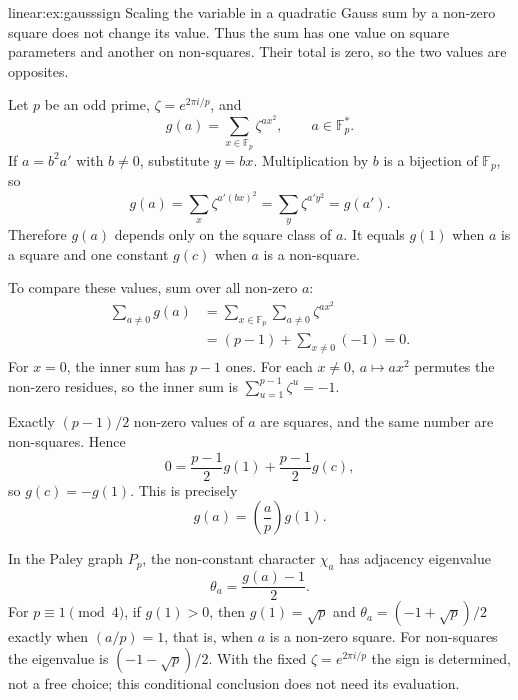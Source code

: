 \begin{solution}{linear:ex:gausssign}
\idea Scaling the variable in a quadratic Gauss sum by a non-zero square does not change its value. Thus the sum has one value on square parameters and another on non-squares. Their total is zero, so the two values are opposites.

\writeup Let $p$ be an odd prime, $\zeta=e^{2\pi i/p}$, and
\[
g(a)=\sum_{x\in\mathbb F_p}\zeta^{a x^2},
\qquad a\in\mathbb F_p^*.
\]
If $a=b^2a'$ with $b\ne0$, substitute $y=bx$. Multiplication by $b$ is a bijection of $\mathbb F_p$, so
\[
g(a)=\sum_x\zeta^{a'(bx)^2}=\sum_y\zeta^{a'y^2}=g(a').
\]
Therefore $g(a)$ depends only on the square class of $a$. It equals $g(1)$ when $a$ is a square and one constant $g(c)$ when $a$ is a non-square.

To compare these values, sum over all non-zero $a$:
\[
\begin{aligned}
\sum_{a\ne0}g(a)
&=\sum_{x\in\mathbb F_p}\sum_{a\ne0}\zeta^{ax^2}\\
&=(p-1)+\sum_{x\ne0}(-1)=0.
\end{aligned}
\]
For $x=0$, the inner sum has $p-1$ ones. For each $x\ne0$, $a\mapsto ax^2$ permutes the non-zero residues, so the inner sum is $\sum_{u=1}^{p-1}\zeta^u=-1$.

Exactly $(p-1)/2$ non-zero values of $a$ are squares, and the same number are non-squares. Hence
\[
0=\frac{p-1}2g(1)+\frac{p-1}2g(c),
\]
so $g(c)=-g(1)$. This is precisely
\[
\boxed{g(a)=\left(\frac ap\right)g(1)}.
\]

In the Paley graph $P_p$, the non-constant character $\chi_a$ has adjacency eigenvalue
\[
\theta_a=\frac{g(a)-1}{2}.
\]
For $p\equiv1\pmod4$, if $g(1)>0$, then $g(1)=\sqrt p$ and
$\theta_a=(-1+\sqrt p)/2$ exactly when $(a/p)=1$, that is, when $a$ is a
non-zero square. For non-squares the eigenvalue is $(-1-\sqrt p)/2$.
With the fixed $\zeta=e^{2\pi i/p}$ the sign is determined, not a free choice;
this conditional conclusion does not need its evaluation.
\end{solution}

